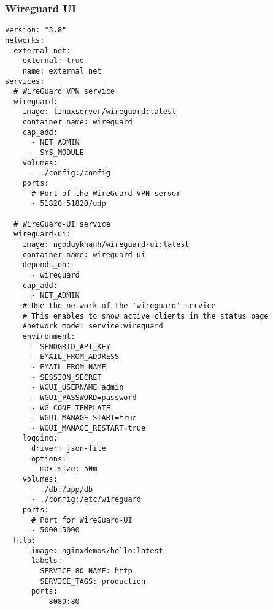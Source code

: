 \subsubsection{Wireguard UI}
\begin{lstlisting}[style=yaml, caption={docker-compose.yml Wireguard prueba de concepto.}, label={lst:wireguard-ui} ]
version: "3.8"
networks:
  external_net:
    external: true
    name: external_net
services:
  # WireGuard VPN service
  wireguard:
    image: linuxserver/wireguard:latest
    container_name: wireguard
    cap_add:
      - NET_ADMIN
      - SYS_MODULE
    volumes:
      - ./config:/config
    ports:
      # Port of the WireGuard VPN server
      - 51820:51820/udp

  # WireGuard-UI service
  wireguard-ui:
    image: ngoduykhanh/wireguard-ui:latest
    container_name: wireguard-ui
    depends_on:
      - wireguard
    cap_add:
      - NET_ADMIN
    # Use the network of the 'wireguard' service
    # This enables to show active clients in the status page
    #network_mode: service:wireguard
    environment:
      - SENDGRID_API_KEY
      - EMAIL_FROM_ADDRESS
      - EMAIL_FROM_NAME
      - SESSION_SECRET
      - WGUI_USERNAME=admin
      - WGUI_PASSWORD=password
      - WG_CONF_TEMPLATE
      - WGUI_MANAGE_START=true
      - WGUI_MANAGE_RESTART=true
    logging:
      driver: json-file
      options:
        max-size: 50m
    volumes:
      - ./db:/app/db
      - ./config:/etc/wireguard
    ports:
      # Port for WireGuard-UI
      - 5000:5000
  http:
      image: nginxdemos/hello:latest
      labels:
        SERVICE_80_NAME: http
        SERVICE_TAGS: production
      ports:
        - 8080:80
\end{lstlisting}

